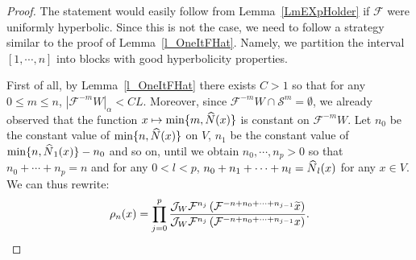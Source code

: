 \documentclass[10pt]{amsart}
\theoremstyle{definition}\newtheorem{defi}[theo]{Definition}\newtheorem{rema}[theo]{Remark}\newtheorem{exam}[theo]{Example}\newtheorem{exem}[theo]{Example}\newtheorem{nota}[theo]{Notation}
\newcommand{\cm}{\mathcal{F}}
\newcommand{\singPrivate}{\mathcal{S}}
\newcommand{\sing}[1]{\singPrivate^{#1}}
\newcommand{\adm}{_{\alpha^{+}}}
\newcommand{\Np}{\hat N}
\newcommand{\tx}{\tilde{x}}
\newcommand{\jac}[1]{\mathcal{J}_{#1}}
\newcommand{\jacW}{\jac{W}}
\renewcommand{\adm}{_{\alpha}}
\let\oldtilde\tilde
\renewcommand*{\tilde}[1]{\mathchoice{\widetilde{#1}}{\widetilde{#1}}{\oldtilde{#1}}{\oldtilde{#1}}}
\let\oldhat\hat
\renewcommand*{\hat}[1]{\mathchoice{\widehat{#1}}{\widehat{#1}}{\oldhat{#1}}{\oldhat{#1}}}
\begin{document}
\begin{proof}
The statement would easily follow from Lemma~\ref{LmEXpHolder} if $\cm$ were uniformly hyperbolic. Since this is not the case, we need to follow a strategy similar to the proof of Lemma~\ref{l_OneItFHat}. Namely, we partition the interval $[1,\cdots, n]$ into blocks with good hyperbolicity properties.

First of all, by Lemma~\ref{l_OneItFHat} there exists $C > 1$ so that for any $0\le m\le n$, $|\cm^{-m}W|\adm < CL$. Moreover, since $\cm^{-m}W\cap \sing m = \emptyset$, we already observed that the function $x\mapsto\min\{m,\Np(x)\}$ is constant on $\cm^{-m}W$. Let $n_0$ be the constant value of $\min\{n,\Np(x)\}$ on $V$, $n_1$ be the constant value of $\min\{n,\Np_{1}(x)\}-n_{0}$ and so on, until we obtain $n_{0},\cdots, n_{p} > 0$ so that $n_{0}+\cdots+n_{p} = n$ and for any $0 < l < p$, $n_{0}+n_{1}+\cdots+n_{l} = \Np_{l}(x)$ for any $x\in V$. We can thus rewrite:
\begin{align*}
\rho_{n}(x) = \prod_{j = 0}^{p}\frac {\jacW\cm^{n_{j}}\left(\cm^{-n+n_{0}+\cdots+n_{j-1}}\tx\right)} {\jacW\cm^{n_{j}}\left(\cm^{-n+n_{0}+\cdots+n_{j-1}}x\right)}.
\end{align*}


\end{proof}
\end{document}
